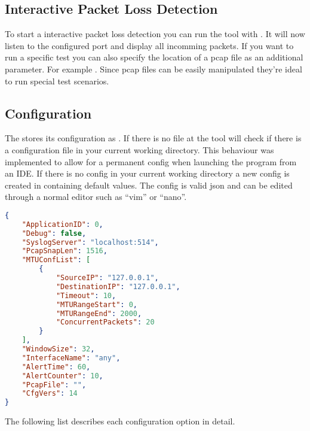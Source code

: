 \subsection{Interactive Packet Loss Detection}
To start a interactive packet loss detection you can run the tool with . It will now listen to the configured port and display all incomming packets. If you want to run a specific test you can also specify the location of a pcap file as an additional parameter. For example . Since pcap files can be easily manipulated they're ideal to run special test scenarios.

\subsection{Configuration}
The \entool{} stores its configuration as . If there is no  file at  the tool will check if there is a configuration file in your current working directory. This behaviour was implemented to allow for a permanent config when launching the program from an \acs{IDE}. If there is no config in your current working directory a new config is created in  containing default values.
The config is valid json and can be edited through a normal editor such as \enquote{vim} or \enquote{nano}.

\begin{lstlisting}[language=json, caption=Sample configuration]
{
    "ApplicationID": 0,
    "Debug": false,
    "SyslogServer": "localhost:514",
    "PcapSnapLen": 1516,
    "MTUConfList": [
        {
            "SourceIP": "127.0.0.1",
            "DestinationIP": "127.0.0.1",
            "Timeout": 10,
            "MTURangeStart": 0,
            "MTURangeEnd": 2000,
            "ConcurrentPackets": 20
        }
    ],
    "WindowSize": 32,
    "InterfaceName": "any",
    "AlertTime": 60,
    "AlertCounter": 10,
    "PcapFile": "", 
    "CfgVers": 14
}
\end{lstlisting}

The following list describes each configuration option in detail.

